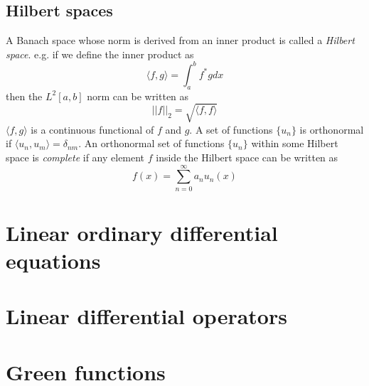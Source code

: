 \documentclass[]{article}
\begin{document}
\subsection{Hilbert spaces}
A Banach space whose norm is derived from an inner product is called a \textit{Hilbert space}. e.g. if we define the inner product as
\begin{equation} \langle f, g \rangle = \int_{a}^{b} f^{*}g dx \end{equation}
then the $L^{2}[a,b]$ norm can be written as 
\begin{equation} ||f||_{2} = \sqrt{\langle f,f \rangle} \end{equation}
$\langle f, g \rangle$ is a continuous functional of $f$ and $g$.
A set of functions $\{ u_{n} \}$ is orthonormal if $\langle u_{n}, u_{m}\rangle = \delta_{nm}$. An orthonormal set of functions $\{ u_{n} \}$ within some Hilbert space is \textit{complete} if any element $f$ inside the Hilbert space can be written as 
\begin{equation} f(x) = \sum_{n=0}^{\infty} a_{n}u_{n}(x) \end{equation}

\newpage
\section{Linear ordinary differential equations}


\newpage
\section{Linear differential operators}


\newpage
\section{Green functions}
\end{document}

